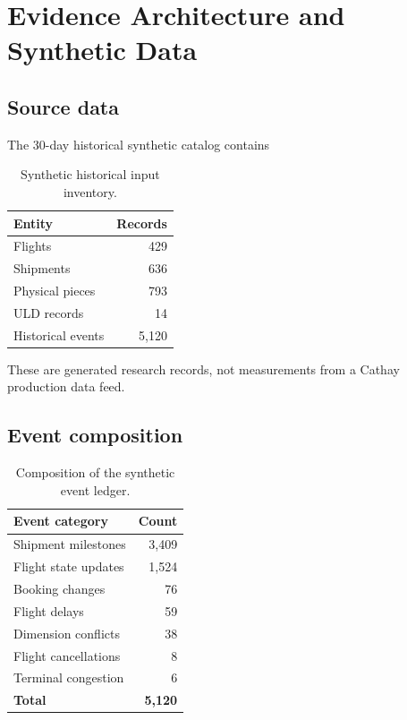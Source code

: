 \documentclass[10pt,a4paper]{article}
\theoremstyle{plain}
\theoremstyle{definition}
\theoremstyle{remark}
\begin{document}
\section{Evidence Architecture and Synthetic Data}

\subsection{Source data}

The 30-day historical synthetic catalog contains

\begin{table}[!htbp]
\centering
\caption{Synthetic historical input inventory.}
\label{tab:data-volume}
\small
\begin{tabular}{@{}lr@{}}
\toprule
Entity & Records \\
\midrule
Flights & 429 \\
Shipments & 636 \\
Physical pieces & 793 \\
ULD records & 14 \\
Historical events & 5,120 \\
\bottomrule
\end{tabular}
\end{table}

These are generated research records,
not measurements from a Cathay
production data feed.

\subsection{Event composition}

\begin{table}[!htbp]
\centering
\caption{Composition of the synthetic event ledger.}
\small
\begin{tabular}{@{}lr@{}}
\toprule
Event category & Count \\
\midrule
Shipment milestones & 3,409 \\
Flight state updates & 1,524 \\
Booking changes & 76 \\
Flight delays & 59 \\
Dimension conflicts & 38 \\
Flight cancellations & 8 \\
Terminal congestion & 6 \\
\midrule
\textbf{Total} & \textbf{5,120} \\
\bottomrule
\end{tabular}
\end{table}
\end{document}

